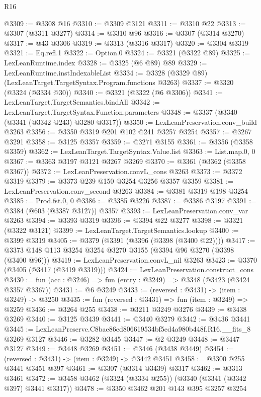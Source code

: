 \begin{lexlean}{R16}
\begin{coremodule}
@3309 := @3308 @16
@3310 := @3309 @3121
@3311 := @3310 @22
@3313 := @3307 (@3311 @3277)
@3314 := @3310 @96
@3316 := @3307 (@3314 @3270)
@3317 := @43 @3306
@3319 := @3313 (@3316 @3317)
@3320 := @3304 @3319
@3321 := Eq.refl.{1}
@3322 := Option.{0}
@3324 := @3321 (@3322 @89)
@3325 := LexLeanRuntime.index
@3328 := @3325 (@6 @89) @89
@3329 := LexLeanRuntime.instIndexableList
@3334 := @3328 (@3329 @89) (LexLeanTarget.TargetSyntax.Program.functions @3263)
@3337 := @3320 (@3324 (@3334 @30))
@3340 := @3321 (@3322 (@6 @3306))
@3341 := LexLeanTarget.TargetSemantics.bindAll
@3342 := LexLeanTarget.TargetSyntax.Function.parameters
@3348 := @3337 (@3340 (@3341 (@3342 @243) @3280 @3317))
@3350 := LexLeanPreservation.conv_build @3263
@3356 := @3350 @3319 @201 @102 @241 @3257 @3254
@3357 := @3267 @3291
@3358 := @3125 @3357
@3359 := @3271 @3155
@3361 := @3356 (@3358 @3359)
@3362 := LexLeanTarget.TargetSyntax.Value.list
@3363 := List.map.{0, 0}
@3367 := @3363 @3197 @3121 @3267 @3269
@3370 := @3361 (@3362 (@3358 @3367))
@3372 := LexLeanPreservation.convL_cons @3263
@3373 := @3372 @3319
@3379 := @3373 @239 @150 @3254 @3256 @3357 @3359
@3381 := LexLeanPreservation.conv_second @3263
@3384 := @3381 @3319 @198 @3254
@3385 := Prod.fst.{0, 0}
@3386 := @3385 @3226
@3387 := @3386 @3197
@3391 := @3384 (@603 (@3387 @3127)) @3357
@3393 := LexLeanPreservation.conv_var @3263
@3394 := @3393 @3319
@3396 := @3394 @22 @3277
@3398 := @3321 (@3322 @3121)
@3399 := LexLeanTarget.TargetSemantics.lookup
@3400 := @3399 @3319
@3405 := @3379 (@3391 (@3396 (@3398 (@3400 @22))))
@3417 := @3373 @148 @113 @3254 @3254 @3270 @3155 (@3394 @96 @3270 (@3398 (@3400 @96)))
@3419 := LexLeanPreservation.convL_nil @3263
@3423 := @3370 (@3405 (@3417 (@3419 @3319)))
@3424 := LexLeanPreservation.construct_cons
@3430 := fun (acc : @3246) => fun (entry : @3249) => @3348 (@3423 (@3424 @3357 @3367))
@3431 := @6 @3249
@3433 := (reversed : @3431) -> (item : @3249) -> @3250
@3435 := fun (reversed : @3431) => fun (item : @3249) => @3259
@3436 := @3264 @255
@3438 := @3211 @3249 @3276
@3439 := @3438 @3269
@3440 := @3125 @3439
@3441 := @3440 @3279
@3442 := @3436 @3441
@3445 := LexLeanPreserve.C8bae86ed806619534bf5ed4a980b448f.R16.__fits_8 @3269 @3127
@3446 := @3282 @3445
@3447 := @2 @3249
@3448 := @3447 @3127
@3449 := @3448 @3269
@3451 := @3446 (@3438 @3449)
@3454 := (reversed : @3431) -> (item : @3249) -> @3442 @3451
@3458 := @3300 @255 @3441 @3451 @397
@3461 := @3307 (@3314 @3439) @3317
@3462 := @3313 @3461
@3472 := @3458 @3462 (@3324 (@3334 @255)) (@3340 (@3341 (@3342 @397) @3441 @3317))
@3478 := @3350 @3462 @201 @143 @395 @3257 @3254

\end{coremodule}
\end{lexlean}
